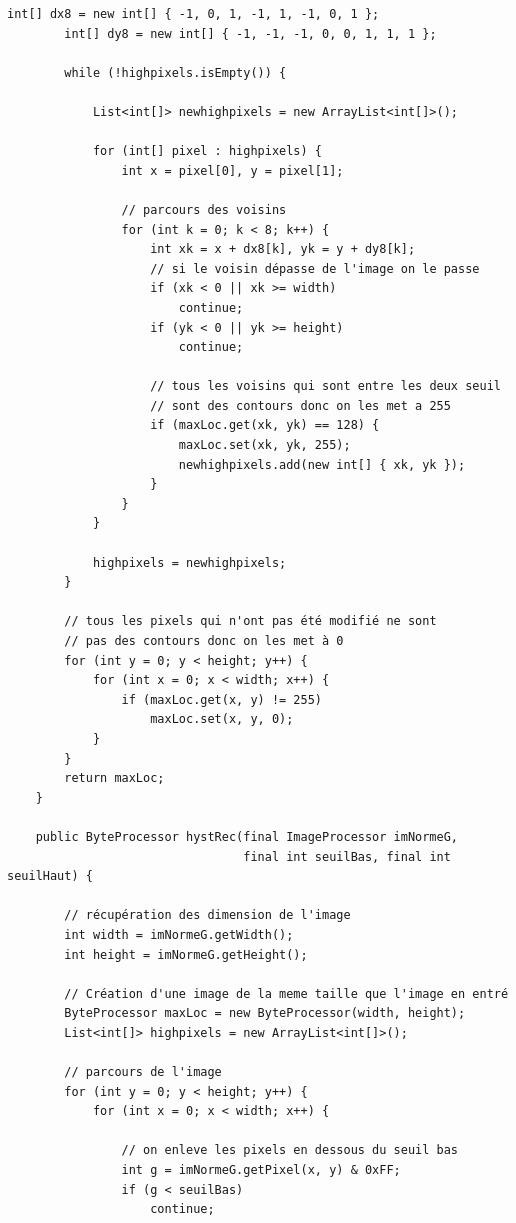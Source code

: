 \documentclass[a4paper,11pt]{article}
\begin{document}
\begin{lstlisting}[caption=Plugin pour le seuillage des maxima locaux par hystérésis]
        int[] dx8 = new int[] { -1, 0, 1, -1, 1, -1, 0, 1 };
        int[] dy8 = new int[] { -1, -1, -1, 0, 0, 1, 1, 1 };

        while (!highpixels.isEmpty()) {

            List<int[]> newhighpixels = new ArrayList<int[]>();

            for (int[] pixel : highpixels) {
                int x = pixel[0], y = pixel[1];

                // parcours des voisins
                for (int k = 0; k < 8; k++) {
                    int xk = x + dx8[k], yk = y + dy8[k];
                    // si le voisin dépasse de l'image on le passe
                    if (xk < 0 || xk >= width)
                        continue;
                    if (yk < 0 || yk >= height)
                        continue;

                    // tous les voisins qui sont entre les deux seuil
                    // sont des contours donc on les met a 255
                    if (maxLoc.get(xk, yk) == 128) {
                        maxLoc.set(xk, yk, 255);
                        newhighpixels.add(new int[] { xk, yk });
                    }
                }
            }

            highpixels = newhighpixels;
        }

        // tous les pixels qui n'ont pas été modifié ne sont
        // pas des contours donc on les met à 0
        for (int y = 0; y < height; y++) {
            for (int x = 0; x < width; x++) {
                if (maxLoc.get(x, y) != 255)
                    maxLoc.set(x, y, 0);
            }
        }
        return maxLoc;
    }

    public ByteProcessor hystRec(final ImageProcessor imNormeG,
                                 final int seuilBas, final int seuilHaut) {

        // récupération des dimension de l'image
        int width = imNormeG.getWidth();
        int height = imNormeG.getHeight();

        // Création d'une image de la meme taille que l'image en entré
        ByteProcessor maxLoc = new ByteProcessor(width, height);
        List<int[]> highpixels = new ArrayList<int[]>();

        // parcours de l'image
        for (int y = 0; y < height; y++) {
            for (int x = 0; x < width; x++) {

                // on enleve les pixels en dessous du seuil bas
                int g = imNormeG.getPixel(x, y) & 0xFF;
                if (g < seuilBas)
                    continue;


\end{lstlisting}
\end{document}
